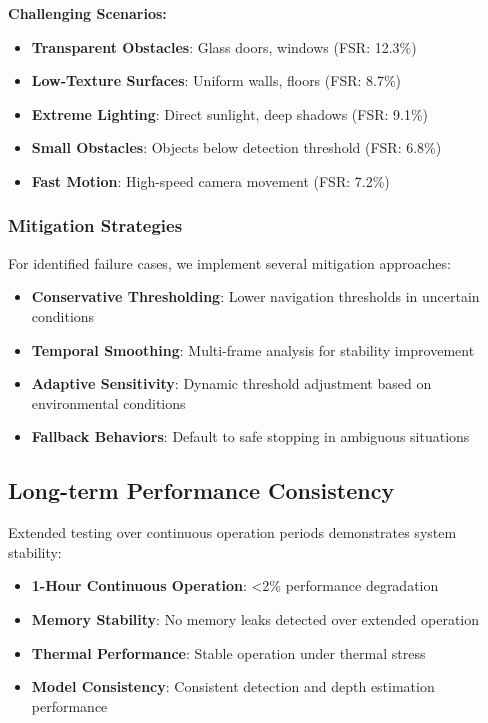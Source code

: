 \documentclass[12pt,oneside]{book}
\begin{document}
\textbf{Challenging Scenarios:}
\begin{itemize}
\item \textbf{Transparent Obstacles}: Glass doors, windows (FSR: 12.3\%)
\item \textbf{Low-Texture Surfaces}: Uniform walls, floors (FSR: 8.7\%)
\item \textbf{Extreme Lighting}: Direct sunlight, deep shadows (FSR: 9.1\%)
\item \textbf{Small Obstacles}: Objects below detection threshold (FSR: 6.8\%)
\item \textbf{Fast Motion}: High-speed camera movement (FSR: 7.2\%)
\end{itemize}

\subsubsection{Mitigation Strategies}

For identified failure cases, we implement several mitigation approaches:

\begin{itemize}
\item \textbf{Conservative Thresholding}: Lower navigation thresholds in uncertain conditions
\item \textbf{Temporal Smoothing}: Multi-frame analysis for stability improvement
\item \textbf{Adaptive Sensitivity}: Dynamic threshold adjustment based on environmental conditions
\item \textbf{Fallback Behaviors}: Default to safe stopping in ambiguous situations
\end{itemize}

\subsection{Long-term Performance Consistency}

Extended testing over continuous operation periods demonstrates system stability:

\begin{itemize}
\item \textbf{1-Hour Continuous Operation}: <2\% performance degradation
\item \textbf{Memory Stability}: No memory leaks detected over extended operation
\item \textbf{Thermal Performance}: Stable operation under thermal stress
\item \textbf{Model Consistency}: Consistent detection and depth estimation performance
\end{itemize}
\end{document}
